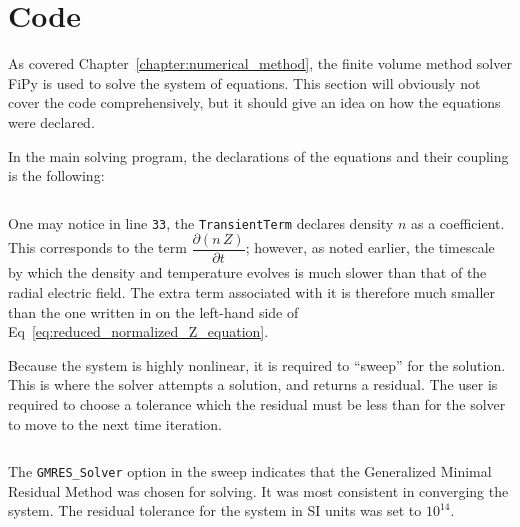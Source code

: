 \chapter{Code}\label{chapter:Code}
As covered Chapter~\ref{chapter:numerical_method}, the finite volume method solver FiPy \cite{guyer_fipy:_2009} is used to solve the system of equations.
This section will obviously not cover the code comprehensively, but it should give an idea on how the equations were declared.

In the main solving program, the declarations of the equations and their coupling is the following:
\inputminted[firstline=22, lastline=43, tabsize=4, breaklines=true, fontsize=\footnotesize, frame=single, linenos=true]{python}{../FiPy_Model/solving_flux.py}
One may notice in line \texttt{33}, the \texttt{TransientTerm} declares density $n$ as a coefficient.
This corresponds to the term $\dfrac{\partial (n \, Z)}{\partial t}$; however, as noted earlier, the timescale by which the density and temperature evolves is much slower than that of the radial electric field.
The extra term associated with it is therefore much smaller than the one written in on the left-hand side of Eq~\ref{eq:reduced_normalized_Z_equation}.

Because the system is highly nonlinear, it is required to ``sweep'' for the solution.
This is where the solver attempts a solution, and returns a residual.
The user is required to choose a tolerance which the residual must be less than for the solver to move to the next time iteration.
\inputminted[firstline=98, lastline=113, tabsize=4, breaklines=true, fontsize=\footnotesize, frame=single, linenos=true]{python}{../FiPy_Model/solving_flux.py}

The \texttt{GMRES_Solver} option in the sweep indicates that the Generalized Minimal Residual Method was chosen for solving.
It was most consistent in converging the system.
The residual tolerance for the system in SI units was set to $10^{14}$.

